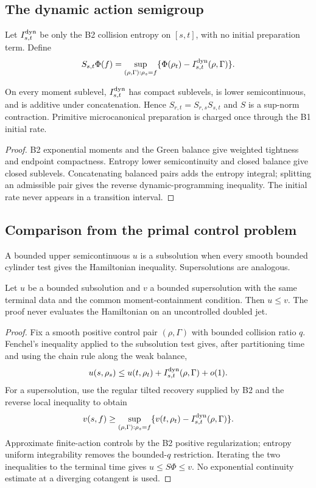 \subsection{The dynamic action semigroup}

Let $I_{s,t}^{\rm dyn}$ be only the B2 collision entropy on $[s,t]$, with no
initial preparation term.  Define
\[
 S_{s,t}\Phi(f)=
 \sup_{(\rho,\Gamma):\rho_s=f}
 \{\Phi(\rho_t)-I_{s,t}^{\rm dyn}(\rho,\Gamma)\}.
\]

\begin{theorem}
\label{thm:r12-b4-action}
On every moment sublevel, $I_{s,t}^{\rm dyn}$ has compact sublevels, is
lower semicontinuous, and is additive under concatenation.  Hence
$S_{r,t}=S_{r,s}S_{s,t}$ and $S$ is a sup-norm contraction.  Primitive
microcanonical preparation is charged once through the B1 initial rate.
\end{theorem}

\begin{proof}
B2 exponential moments and the Green balance give weighted tightness and
endpoint compactness.  Entropy lower semicontinuity and closed balance give
closed sublevels.  Concatenating balanced pairs adds the entropy integral;
splitting an admissible pair gives the reverse dynamic-programming
inequality.  The initial rate never appears in a transition interval.
\end{proof}

\subsection{Comparison from the primal control problem}

A bounded upper semicontinuous $u$ is a subsolution when every smooth bounded
cylinder test gives the Hamiltonian inequality.  Supersolutions are analogous.

\begin{theorem}
\label{thm:r12-b4-comparison}
Let $u$ be a bounded subsolution and $v$ a bounded supersolution with the same
terminal data and the common moment-containment condition.  Then $u\le v$.
The proof never evaluates the Hamiltonian on an uncontrolled doubled jet.
\end{theorem}

\begin{proof}
Fix a smooth positive control pair $(\rho,\Gamma)$ with bounded collision ratio
$q$.  Fenchel's inequality applied to the subsolution test gives, after
partitioning time and using the chain rule along the weak balance,
\[
 u(s,\rho_s)\le u(t,\rho_t)+I_{s,t}^{\rm dyn}(\rho,\Gamma)+o(1).
\]
For a supersolution, use the regular tilted recovery supplied by B2 and the
reverse local inequality to obtain
\[
 v(s,f)\ge
 \sup_{(\rho,\Gamma):\rho_s=f}
 \{v(t,\rho_t)-I_{s,t}^{\rm dyn}(\rho,\Gamma)\}.
\]
Approximate finite-action controls by the B2 positive regularization; entropy
uniform integrability removes the bounded-$q$ restriction.  Iterating the two
inequalities to the terminal time gives
$u\le S\Phi\le v$.  No exponential continuity estimate at a diverging
cotangent is used.
\end{proof}

